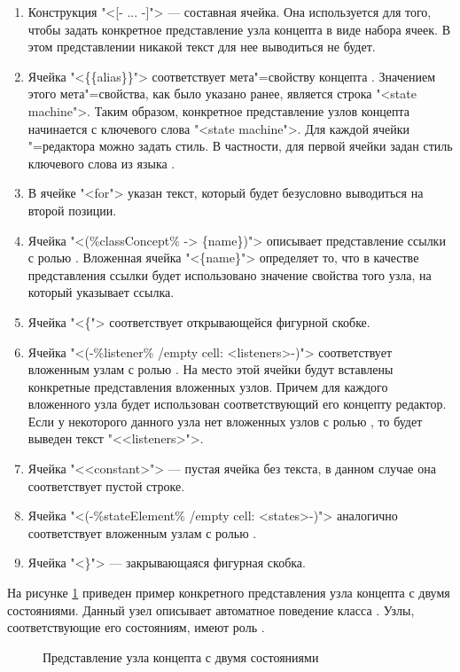\begin{enumerate}
\item Конструкция "<[- ... -]"> --- составная ячейка. Она используется для того, чтобы задать конкретное представление узла концепта  в виде набора ячеек. В этом представлении никакой текст для нее выводиться не будет.
\item Ячейка "<\{\{alias\}\}"> соответствует мета"=свойству  концепта . Значением этого мета"=свойства, как было указано ранее, является строка "<state machine">. Таким образом, конкретное представление узлов концепта  начинается с ключевого слова "<state machine">. Для каждой ячейки 
\MPS{}"=редактора можно задать стиль. В частности, для первой ячейки задан стиль ключевого слова из языка .
\item В ячейке "<for"> указан текст, который будет безусловно выводиться на второй позиции.
\item Ячейка "<(\%classConcept\% -> \{name\})"> описывает представление ссылки с ролью . Вложенная ячейка "<\{name\}"> определяет то, что в качестве представления ссылки будет использовано значение свойства  того узла, на который указывает ссылка.
\item Ячейка "<\{"> соответствует открывающейся фигурной скобке.
\item Ячейка "<(-\%listener\% /empty cell: <listeners>-)"> соответствует вложенным узлам с ролью . На место этой ячейки будут вставлены конкретные представления вложенных узлов. Причем для каждого вложенного узла будет использован соответствующий его концепту редактор. Если у некоторого данного узла  нет вложенных узлов с ролью , то будет выведен текст "<<listeners>">.
\item Ячейка "<<constant>"> --- пустая ячейка без текста, в данном случае она соответствует пустой строке.
\item Ячейка "<(-\%stateElement\% /empty cell: <states>-)"> аналогично соответствует вложенным узлам с ролью 
.
\item Ячейка "<\}"> --- закрывающаяся фигурная скобка.
\end{enumerate}

На рисунке \ref{fig:EmptyStateMachine} приведен пример конкретного представления узла концепта  с двумя состояниями. Данный узел описывает автоматное поведение класса . Узлы, соответствующие его состояниям, имеют роль .

\begin{figure}
 \centering
 \caption{Представление узла концепта  с двумя состояниями}
 \label{fig:EmptyStateMachine}
\end{figure}
